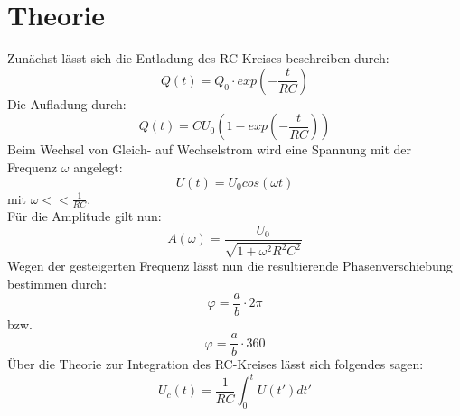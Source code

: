 \section{Theorie}
Zunächst lässt sich die Entladung des RC-Kreises beschreiben durch:
\begin{equation} 
Q(t) = Q_0\cdot exp(-\frac{t}{RC})
\end{equation}
Die Aufladung durch:
\begin{equation} 
Q(t) = C U_0 (1 - exp(-\frac{t}{RC}))
\end{equation}
Beim Wechsel von Gleich- auf Wechselstrom wird eine Spannung mit der Frequenz $\omega$ angelegt:
\begin{equation} 
U(t) = U_0 cos(\omega t)
\end{equation}
mit $\omega << \frac{1}{RC}$. \\
Für die Amplitude gilt nun:
\begin{equation} 
A(\omega) = \frac{U_0}{\sqrt{1 + \omega ^2R^2C^2}}
\end{equation}
Wegen der gesteigerten Frequenz lässt nun die resultierende Phasenverschiebung bestimmen durch:
\begin{equation} 
\varphi = \frac{a}{b}\cdot 2\pi 
\end{equation}
bzw.
\begin{equation} 
\varphi = \frac{a}{b}\cdot 360 
\end{equation}
Über die Theorie zur Integration des RC-Kreises lässt sich folgendes sagen:
\begin{equation} 
U_c(t) = \frac{1}{RC}\int_{0}^{t} U(t') dt'
\end{equation}
